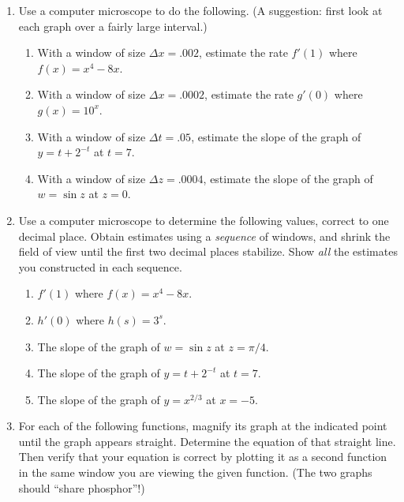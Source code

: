 \begin{enumerate}
\item Use a computer microscope to do the following.  (A suggestion:
first look at each graph over a fairly large interval.)


  \begin{enumerate}
  \item With a window of size $\Delta x = .002$, estimate the rate
$f'(1)$ where $f(x) = x^4 - 8x$.

  \item With a window of size $\Delta x = .0002$, estimate the rate
$g'(0)$ where $g(x) = 10^x$.

  \item With a window of size $\Delta t = .05$, estimate the slope of the
graph of $y = t + 2^{-t}$ at $t = 7$.

  \item With a window of size $\Delta z = .0004$, estimate the slope of
the graph of $w = \sin{z}$ at $z = 0$.



\end{enumerate}
\item Use a computer microscope to determine the following values,
correct to one decimal place.  Obtain estimates using a {\em sequence\/}
of windows, and shrink the field of view until the first two decimal
places stabilize.  Show {\em all\/} the estimates you constructed in
each sequence.

  \begin{enumerate}
  \item $f'(1)$ where $f(x) = x^4 - 8x$.

  \item $h'(0)$ where $h(s) = 3^s$.

  \item The slope of the graph of $w = \sin{z}$ at $z = \pi/4$.

  \item The slope of the graph of $y = t + 2^{-t}$ at $t = 7$.

  \item The slope of the graph of $y = x^{2/3}$ at $x = -5$.



\end{enumerate}
\item For each of the following functions, magnify its graph at the
indicated point until the graph appears straight.  Determine the
equation of that straight line.  Then verify that your equation is
correct by plotting it as a second function in the same window you are
viewing the given function.  (The two graphs should ``share
phosphor''!)



\end{enumerate}
